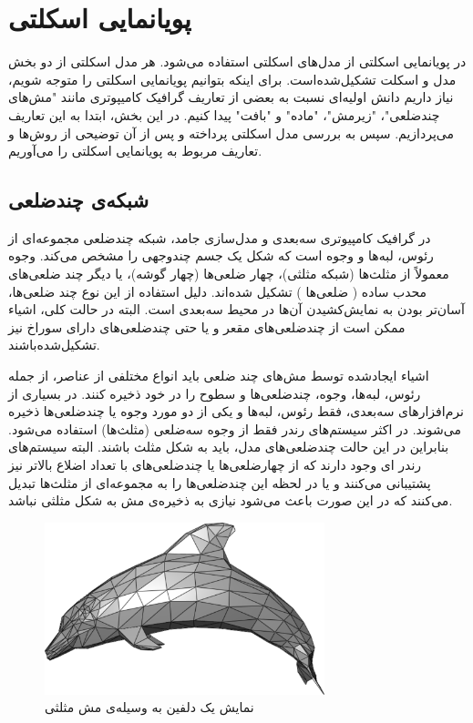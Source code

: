 






\section{ پویانمایی اسکلتی}

در پویانمایی اسکلتی از مدل‌های اسکلتی استفاده می‌شود. هر مدل اسکلتی از دو بخش مدل و اسکلت تشکیل‌شده‌است. 
برای اینکه بتوانیم پویانمایی اسکلتی را متوجه شویم، نیاز داریم دانش اولیه‌ای نسبت به بعضی 
از تعاریف گرافیک کامیپوتری مانند "مش‌های چندضلعی"، "زیرمش"، "ماده" و "بافت" پیدا کنیم.
در این بخش، ابتدا به این تعاریف می‌پردازیم.
سپس به بررسی مدل اسکلتی پرداخته و پس از آن توضیحی از روش‌ها و تعاریف 
مربوط به پویانمایی اسکلتی را می‌آوریم.


\subsection{شبکه‌ی\protect{} چندضلعی}

در گرافیک کامپیوتری سه‌بعدی و مدل‌سازی جامد، شبکه چند‌ضلعی مجموعه‌ای از رئوس، لبه‌ها و وجوه است که شکل یک جسم چند‌وجهی را مشخص می‌کند.
وجوه معمولاً از مثلث‌ها (شبکه مثلثی)، چهار ضلعی‌ها (چهار گوشه)، یا دیگر چند ضلعی‌های محدب ساده
(
	ضلعی‌ها
)
تشکیل شده‌اند. دلیل استفاده از این نوع چند ضلعی‌ها، آسان‌تر بودن به نمایش‌کشیدن آن‌ها در محیط سه‌بعدی است.
البته در حالت کلی، اشیاء ممکن است از چندضلعی‌های مقعر و یا حتی چندضلعی‌های دارای سوراخ نیز تشکیل‌شده‌باشند.

اشیاء ایجادشده توسط مش‌های چند ضلعی باید انواع مختلفی از عناصر، از جمله رئوس، لبه‌ها، وجوه، چندضلعی‌ها و سطوح را در خود ذخیره کنند.
در بسیاری از نرم‌افزارهای سه‌بعدی، فقط رئوس، لبه‌ها و یکی از دو مورد وجوه یا چند‌ضلعی‌ها ذخیره می‌شوند.
در اکثر سیستم‌های رندر
فقط از وجوه سه‌ضلعی
(مثلث‌ها)
استفاده‌ می‌شود.
بنابراین در این حالت چند‌ضلعی‌های مدل، باید به شکل مثلث باشند. البته سیستم‌های رندر‌ ای وجود دارند که از چهارضلعی‌ها یا چندضلعی‌های با تعداد اضلاع بالاتر نیز پشتیبانی ‌می‌کنند و یا در لحظه این چندضلعی‌ها را به مجموعه‌ای از مثلث‌ها تبدیل می‌کنند که در این صورت باعث ‌می‌شود نیازی به ذخیره‌ی مش به شکل مثلثی نباشد.

\begin{figure}[ht]
	\centerline{\includegraphics[width=\textwidth,height=5cm,keepaspectratio]{Figures/Ch2/Dolphin.png}}

	\caption{نمایش یک دلفین به وسیله‌ی مش مثلثی\cite{PolygonMeshWikipedia}}
	\label{fig:DolphinMesh}
\end{figure}


